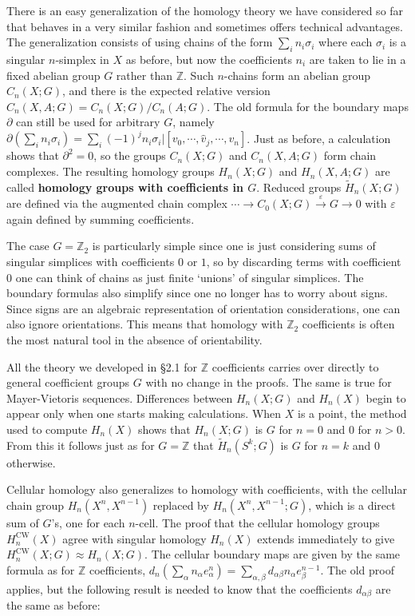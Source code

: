 There is an easy generalization of the homology theory we have considered so far that behaves in a very similar fashion and sometimes offers technical advantages. The generalization consists of using chains of the form $\sum_i n_i \sigma_i$ where each $\sigma_i$ is a singular $n$-simplex in $X$ as before, but now the coefficients $n_i$ are taken to lie in a fixed abelian group $G$ rather than $\mathbb{Z}$. Such $n$-chains form an abelian group $C_n(X; G)$, and there is the expected relative version $C_n(X, A; G) = C_n(X; G)/C_n(A; G)$. The old formula for the boundary maps $\partial$ can still be used for arbitrary $G$, namely $\partial(\sum_i n_i \sigma_i) = \sum_i (-1)^j n_i \sigma_i|[v_0, \cdots, \hat{v}_j, \cdots, v_n]$. Just as before, a calculation shows that $\partial^2 = 0$, so the groups $C_n(X; G)$ and $C_n(X, A; G)$ form chain complexes. The resulting homology groups $H_n(X; G)$ and $H_n(X, A; G)$ are called \textbf{homology groups with coefficients in $G$}. Reduced groups $\tilde{H}_n(X; G)$ are defined via the augmented chain complex $\cdots \to C_0(X; G) \xrightarrow{\varepsilon} G \to 0$ with $\varepsilon$ again defined by summing coefficients.

The case $G = \mathbb{Z}_2$ is particularly simple since one is just considering sums of singular simplices with coefficients $0$ or $1$, so by discarding terms with coefficient $0$ one can think of chains as just finite `unions' of singular simplices. The boundary formulas also simplify since one no longer has to worry about signs. Since signs are an algebraic representation of orientation considerations, one can also ignore orientations. This means that homology with $\mathbb{Z}_2$ coefficients is often the most natural tool in the absence of orientability.

All the theory we developed in \S2.1 for $\mathbb{Z}$ coefficients carries over directly to general coefficient groups $G$ with no change in the proofs. The same is true for Mayer-Vietoris sequences. Differences between $H_n(X; G)$ and $H_n(X)$ begin to appear only when one starts making calculations. When $X$ is a point, the method used to compute $H_n(X)$ shows that $H_n(X; G)$ is $G$ for $n = 0$ and $0$ for $n > 0$. From this it follows just as for $G = \mathbb{Z}$ that $\tilde{H}_n(S^k; G)$ is $G$ for $n = k$ and $0$ otherwise.

Cellular homology also generalizes to homology with coefficients, with the cellular chain group $H_n(X^n, X^{n-1})$ replaced by $H_n(X^n, X^{n-1}; G)$, which is a direct sum of $G$'s, one for each $n$-cell. The proof that the cellular homology groups $H_n^{\mathrm{CW}}(X)$ agree with singular homology $H_n(X)$ extends immediately to give $H_n^{\mathrm{CW}}(X; G) \approx H_n(X; G)$. The cellular boundary maps are given by the same formula as for $\mathbb{Z}$ coefficients, $d_n(\sum_\alpha n_\alpha e_\alpha^n) = \sum_{\alpha,\beta} d_{\alpha\beta} n_\alpha e_\beta^{n-1}$. The old proof applies, but the following result is needed to know that the coefficients $d_{\alpha\beta}$ are the same as before:

